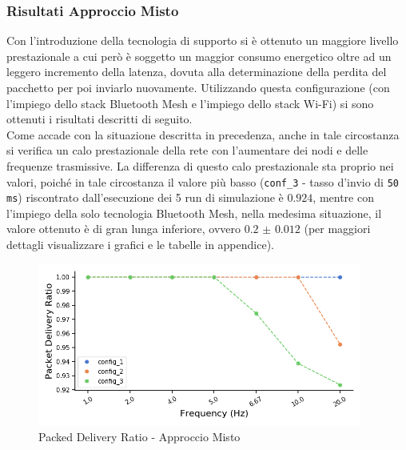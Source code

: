 \subsubsection{Risultati Approccio Misto}
Con l'introduzione della tecnologia di supporto si è ottenuto un maggiore livello prestazionale a cui però è soggetto un maggior consumo energetico oltre ad un leggero incremento della latenza, dovuta alla determinazione della perdita del pacchetto per poi inviarlo nuovamente. Utilizzando questa configurazione (con l'impiego dello stack Bluetooth Mesh e l'impiego dello stack Wi-Fi) si sono ottenuti i risultati descritti di seguito.\\

\noindent Come accade con la situazione descritta in precedenza, anche in tale circostanza si verifica un calo prestazionale della rete con l'aumentare dei nodi e delle frequenze trasmissive. La differenza di questo calo prestazionale sta proprio nei valori, poiché in tale circostanza il valore più basso (\texttt{conf\_3} - tasso d'invio di \texttt{50 ms}) riscontrato dall'esecuzione dei 5 run di simulazione è $0.924$, mentre con l'impiego della solo tecnologia Bluetooth Mesh, nella medesima situazione, il valore ottenuto è di gran lunga inferiore, ovvero $0.2$ $\pm$ $0.012$ (per maggiori dettagli visualizzare i grafici e le tabelle in appendice).

\begin{figure}[hbt!]
    \centering
    \includegraphics[width = 0.95\textwidth]{images/graphs/ble_wifi_pdr.png}
    \caption{Packed Delivery Ratio - Approccio Misto}
    \label{graph:ble_wifi_pdr}
\end{figure}

